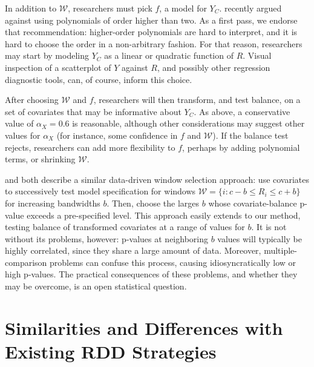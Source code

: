 \documentclass[12pt]{article}
\begin{document}
In addition to $\mathcal{W}$, researchers must pick $f$, a model for $Y_C$.
\citet{gelman2014high} recently argued against using polynomials of
order higher than two.
As a first pass, we endorse that recommendation: higher-order
polynomials are hard to interpret, and it is hard to choose the order
in a non-arbitrary fashion.
For that reason, researchers may start by modeling $Y_C$ as a linear
or quadratic function of $R$.
Visual inspection of a scatterplot of $Y$ against $R$, and possibly
other regression diagnostic tools, can, of course, inform this
choice.

After choosing $\mathcal{W}$ and $f$, researchers will then transform,
and test balance, on a set of covariates that may be informative about
$Y_C$.
As above, a conservative value of $\alpha_X=0.6$ is reasonable,
although other considerations may suggest other values for
$\alpha_X$ (for instance, some confidence in
$f$ and $\mathcal{W}$).
If the balance test rejects, researchers can add more flexibility to
$f$, perhaps by adding polynomial terms, or shrinking
$\mathcal{W}$.

\citet{rocio} and \citet{angrist2012wanna} both describe a similar data-driven window selection approach:
    use covariates to successively test model specification  for
    windows $\mathcal{W}=\{i: c-b\le R_i\le c+b\}$ for increasing bandwidths $b$.
Then, choose the larges $b$ whose covariate-balance p-value exceeds a pre-specified level.
This approach easily extends to our method, testing balance of transformed covariates at a range of values for $b$.
It is not without its problems, however: p-values at neighboring $b$ values will typically be highly correlated, since they share a large amount of data.
Moreover, multiple-comparison problems can confuse this process, causing idiosyncratically low or high p-values.
The practical consequences of these problems, and whether they may be overcome, is an open statistical question.

\section{Similarities and Differences with Existing RDD Strategies}
\end{document}
